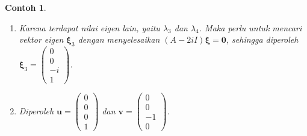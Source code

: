 \documentclass[a4paper]{article}
\theoremstyle{definisi}
\newtheorem{contoh}{Contoh}[section]
\newcommand{\bfxi}{\boldsymbol{\xi}}
\numberwithin{equation}{section}
\begin{document}
\begin{contoh}
\begin{enumerate}[label=Langkah \arabic*: ,leftmargin=*]
\begin{equation}
        \begin{split}
          \mathbf{x}_1(t) &= \left(\begin{pmatrix}0\\1\\0\\0\end{pmatrix}\cos(t) - \begin{pmatrix}1\\0\\0\\0\end{pmatrix}\sin(t)\right) = \begin{pmatrix}-\sin(t)\\ \cos(t)\\0\\0\end{pmatrix}\\
          \mathbf{x}_2(t) &= \left(\begin{pmatrix}0\\1\\0\\0\end{pmatrix}\sin(t) + \begin{pmatrix}1\\0\\0\\0\end{pmatrix}\cos(t)\right) = \begin{pmatrix}\cos(t)\\ \sin(t)\\0\\0\end{pmatrix}
        \end{split}
      \end{equation}
      \item Karena terdapat nilai eigen lain, yaitu $\lambda_3$ dan $\lambda_4$. Maka perlu untuk mencari vektor eigen $\bfxi_3$ dengan menyelesaikan $(A-2iI)\bfxi = \mathbf{0}$, sehingga diperoleh $\bfxi_3 = \begin{pmatrix}0\\0\\-i\\1\end{pmatrix}$.
      \item Diperoleh $\mathbf{u} = \begin{pmatrix}0\\0\\0\\1\end{pmatrix}$ dan $\mathbf{v} = \begin{pmatrix}0\\0\\-1\\0\end{pmatrix}$.

\end{enumerate}
\end{contoh}
\end{document}

